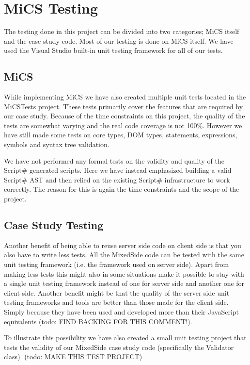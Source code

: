 \chapter{MiCS Testing}
	The testing done in this project can be divided into two categories; MiCS itself and the case study code. Most of our testing is done on MiCS itself. We have used the Visual Studio built-in unit testing framework for all of our tests.
\section{MiCS} %
\label{sec:mics}
	While implementing MiCS we have also created multiple unit tests located in the MiCSTests project. These tests primarily cover the features that are required by our case study. Because of the time constraints on this project, the quality of the tests are somewhat varying and the real code coverage is not 100\%. However we have still made some tests on core types, DOM types, statements, expressions, symbols and syntax tree validation.

	We have not performed any formal tests on the validity and quality of the Script\# generated scripts. Here we have instead emphasized building a valid Script\# AST and then relied on the existing Script\# infrastructure to work correctly. The reason for this is again the time constraints and the scope of the project.
\section{Case Study Testing} %
\label{sec:user_code_testing}
	Another benefit of being able to reuse server side code on client side is that you also have to write less tests. All the MixedSide code can be tested with the same unit testing framework (i.e. the framework used on server side). Apart from making less tests this might also in some situations make it possible to stay with a single unit testing framework instead of one for server side and another one for client side. Another benefit might be that the quality of the server side unit testing frameworks and tools are better than those made for the client side. Simply because they have been used and developed more than their JavaScript equivalents (todo: FIND BACKING FOR THIS COMMENT!).

	To illustrate this possibility we have also created a small unit testing project that tests the validity of our MixedSide case study code (specifically the Validator class). (todo: MAKE THIS TEST PROJECT)

